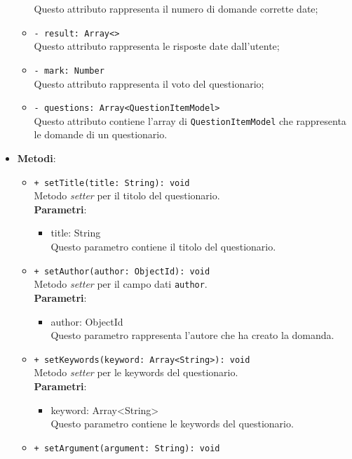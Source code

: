 \begin{itemize}
\begin{itemize}
				Questo attributo rappresenta il numero di domande corrette date;
				\item \texttt{- result: Array<>}\\
				Questo attributo rappresenta le risposte date dall'utente;
				\item \texttt{- mark: Number}\\
				Questo attributo rappresenta il voto del questionario;
			    \item \texttt{- questions: Array<QuestionItemModel>}\\
				Questo attributo contiene l'array di \texttt{QuestionItemModel} che rappresenta le domande di un questionario.
			\end{itemize}
			\item \textbf{Metodi}: 
			\begin{itemize}
				\item \texttt{+ setTitle(title: String): void} \\
				Metodo \textit{setter} per il titolo del questionario.\\
				\textbf{Parametri}:
				\begin{itemize}
					\item {title: String}\\
					Questo parametro contiene il titolo del questionario. 
				\end{itemize}
				\item \texttt{+ setAuthor(author: ObjectId): void} \\
				Metodo \textit{setter} per il campo dati \texttt{author}.\\
				\textbf{Parametri}:
				\begin{itemize}
					\item {author: ObjectId}\\
					Questo parametro rappresenta l'autore che ha creato la domanda.
				\end{itemize}
				\item \texttt{+ setKeywords(keyword: Array<String>): void} \\
				Metodo \textit{setter} per le keywords del questionario.\\
				\textbf{Parametri}:
				\begin{itemize}
					\item {keyword: Array<String>}\\
					Questo parametro contiene le keywords del questionario. 
				\end{itemize}
				\item \texttt{+ setArgument(argument: String): void} \\

\end{itemize}
\end{itemize}

